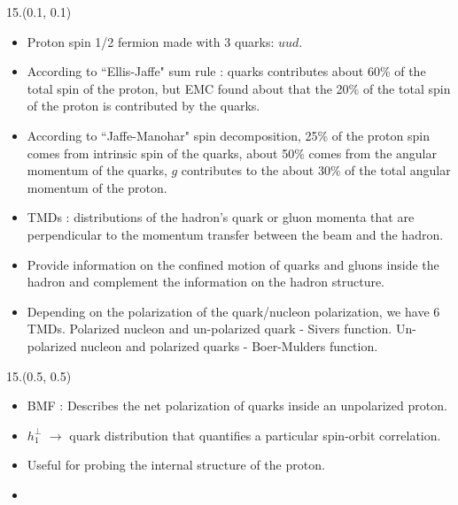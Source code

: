 \documentclass[8pt, xcolor={dvipsnames}, sans, mathserif]{beamer}
\newenvironment{List}[2]
{\begin{textblock}{#1}#2
\begin{itemize}}
{\end{itemize}
\end{textblock}}
\begin{document}
\begin{frame}
\begin{List}{15.}{(0.1, 0.1)}

  \item Proton spin 1/2 fermion made with 3 quarks: $uud$.

  \item According to ``Ellis-Jaffe" sum rule : quarks contributes about 60\% of the total spin of the proton, but EMC found about that the 20\% of the total spin of the proton is contributed by the quarks.

  \item According to ``Jaffe-Manohar" spin decomposition, 25\% of the proton spin comes from intrinsic spin of the quarks, about 50\% comes from the angular momentum of the quarks, $g$ contributes to the about 30\% of the total angular momentum of the proton.

  \item  TMDs : distributions of the hadron's quark or gluon momenta that are perpendicular to the momentum transfer between the beam and the hadron.

  \item Provide information on the confined motion of quarks and gluons inside the hadron and complement the information on the hadron structure.

  \item Depending on the polarization of the quark/nucleon polarization, we have 6 TMDs. Polarized nucleon and un-polarized quark - Sivers function. Un-polarized nucleon and polarized quarks - Boer-Mulders function.

\end{List}
\end{frame}

\begin{frame}
\begin{List}{15.}{(0.5, 0.5)}

  \item BMF : Describes the net polarization of quarks inside an unpolarized proton.

  \item $h_{1}^{\perp}$ $\rightarrow$ quark distribution that quantifies a particular spin-orbit correlation.

  \item Useful for probing the internal structure of the proton.

  \item

\end{List}
\end{frame}
\end{document}
